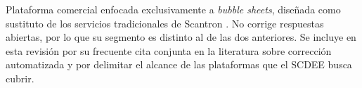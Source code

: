 Plataforma comercial enfocada exclusivamente a \textit{bubble sheets},
diseñada como sustituto de los servicios tradicionales de Scantron
\cite{akindi}. No corrige respuestas abiertas, por lo que su segmento es
distinto al de las dos anteriores. Se incluye en esta revisión por su
frecuente cita conjunta en la literatura sobre corrección automatizada y
por delimitar el alcance de las plataformas que el SCDEE busca cubrir.
